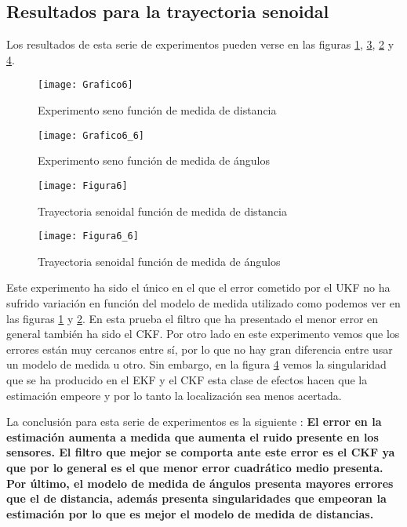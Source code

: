 \subsection{Resultados para la trayectoria senoidal}
Los resultados de esta serie de experimentos pueden verse en las figuras \ref{Grafico6}, \ref{Figura6}, \ref{Grafico6_6} y \ref{Figura6_6}.
\begin{figure}[ht!]
\centering
\texttt{[image: Grafico6]}
\caption{Experimento seno función de medida de distancia} \label{Grafico6}
\end{figure}
\begin{figure}[ht!]
\centering
\texttt{[image: Grafico6\_6]}
\caption{Experimento seno función de medida de ángulos} \label{Grafico6_6}
\end{figure}
\begin{figure}[ht!]
\centering
\texttt{[image: Figura6]}
\caption{Trayectoria senoidal función de medida de distancia} \label{Figura6}
\end{figure}

\begin{figure}[ht!]
\texttt{[image: Figura6\_6]}
\caption{Trayectoria senoidal función de medida de ángulos} \label{Figura6_6}
\end{figure}
Este experimento ha sido el único en el que el error cometido por el \ac{UKF} no ha sufrido variación en función del modelo de medida utilizado como podemos ver en las figuras \ref{Grafico6} y \ref{Grafico6_6}.
En esta prueba el filtro que ha presentado el menor error en general también ha sido el \ac{CKF}.
Por otro lado en este experimento vemos que los errores están muy cercanos entre sí, por lo que no hay gran diferencia entre usar un modelo de medida u otro.
Sin embargo, en la figura \ref{Figura6_6} vemos la singularidad que se ha producido en el \ac{EKF} y el \ac{CKF} esta clase de efectos hacen que la estimación empeore y por lo tanto la localización sea menos acertada.

La conclusión para esta serie de experimentos es la siguiente : \textbf{El error en la estimación aumenta a medida que aumenta el ruido presente en los sensores. El filtro que mejor se comporta ante este error es el \ac{CKF} ya que por lo general es el que menor error cuadrático medio presenta. Por último, el modelo de medida de ángulos presenta mayores errores que el de distancia, además presenta singularidades que empeoran la estimación por lo que es mejor el modelo de medida de distancias.}
%
%
%

